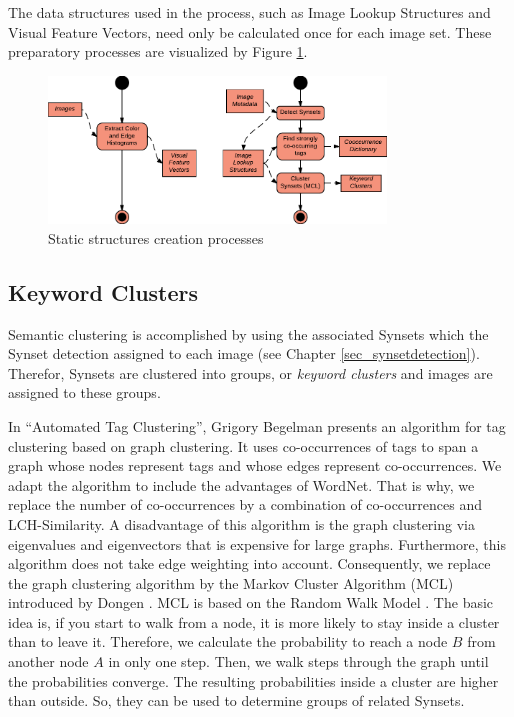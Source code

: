 The data structures used in the process, such as Image Lookup Structures and Visual Feature Vectors, need only be calculated once for each image set. These preparatory processes are visualized by Figure \ref{fig_precalcprocess}.

\begin{figure}[h]
\centering
\includegraphics[width=0.8\textwidth]{images/precalcs_activity_diagram.pdf}
\caption{Static structures creation processes}
\label{fig_precalcprocess}
\end{figure}


\subsection{Keyword Clusters}
\label{sec_keywordclustering}

Semantic clustering is accomplished by using the associated Synsets which the Synset detection assigned to each image (see Chapter \ref{sec_synsetdetection}). Therefor, Synsets are clustered into groups, or \emph{keyword clusters} and images are assigned to these groups.

\bigskip
In ``Automated Tag Clustering''\cite{begelman2006automated}, Grigory Begelman presents an algorithm for tag clustering based on graph clustering. It uses co-occurrences of tags to span a graph whose nodes represent tags and whose edges represent co-occurrences. We adapt the algorithm to include the advantages of WordNet. That is why, we replace the number of co-occurrences by a combination of co-occurrences and LCH-Similarity.
A disadvantage of this algorithm is the graph clustering via eigenvalues and eigenvectors that is expensive for large graphs. Furthermore, this algorithm does not take edge weighting into account.
Consequently, we replace the graph clustering algorithm by the Markov Cluster Algorithm (MCL) introduced by Dongen \cite{Dongen1998}. MCL is based on the Random Walk Model \cite{spitzer2001principles}. The basic idea is, if you start to walk from a node, it is more likely to stay inside a cluster than to leave it. Therefore, we calculate the probability to reach a node $B$ from another node $A$ in only one step. Then, we walk steps through the graph until the probabilities converge. The resulting probabilities inside a cluster are higher than outside. So, they can be used to determine groups of related Synsets.

